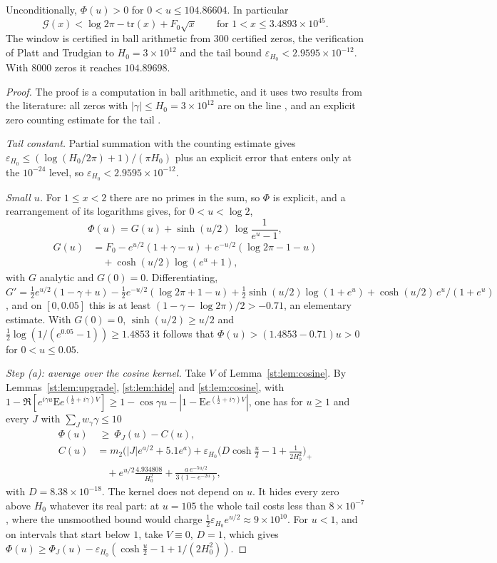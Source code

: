 \begin{theorem}\label{st:thm:cert}
Unconditionally, $\Phi(u)>0$ for $0<u\le104.86604$. In particular
\[
\mathcal G(x)<\log2\pi-\mathrm{tr}(x)+F_0\sqrt x\qquad\text{for }1<x\le3.4893\times10^{45}.
\]
The window is certified in ball arithmetic from 300 certified zeros, the verification of Platt and Trudgian to $H_0=3\times10^{12}$ and the tail bound $\varepsilon_{H_0}<2.9595\times10^{-12}$. With 8000 zeros it reaches $104.89698$.
\end{theorem}
\begin{proof}
The proof is a computation in ball arithmetic, and it uses two results from the literature: all zeros with $|\gamma|\le H_0=3\times10^{12}$ are on the line \cite{PT21}, and an explicit zero counting estimate for the tail \cite{HSW22}.

\emph{Tail constant.} Partial summation with the counting estimate gives $\varepsilon_{H_0}\le(\log(H_0/2\pi)+1)/(\pi H_0)$ plus an explicit error that enters only at the $10^{-24}$ level, so $\varepsilon_{H_0}<2.9595\times10^{-12}$.

\emph{Small $u$.} For $1\le x<2$ there are no primes in the sum, so $\Phi$ is explicit, and a rearrangement of its logarithms gives, for $0<u<\log2$,
\[
\Phi(u)=G(u)+\sinh(u/2)\,\log\frac1{e^u-1},
\]
\begin{align*}
G(u)&=F_0-e^{u/2}(1+\gamma-u)+e^{-u/2}(\log2\pi-1-u)\\
&\quad+\cosh(u/2)\log(e^u+1),
\end{align*}
with $G$ analytic and $G(0)=0$. Differentiating, $G'=\tfrac12e^{u/2}(1-\gamma+u)-\tfrac12e^{-u/2}(\log2\pi+1-u)+\tfrac12\sinh(u/2)\log(1+e^u)+\cosh(u/2)\,e^u/(1+e^u)$, and on $[0,0.05]$ this is at least $(1-\gamma-\log2\pi)/2>-0.71$, an elementary estimate. With $G(0)=0$, $\sinh(u/2)\ge u/2$ and $\tfrac12\log(1/(e^{0.05}-1))\ge1.4853$ it follows that $\Phi(u)>(1.4853-0.71)u>0$ for $0<u\le0.05$.

\emph{Step (a): average over the cosine kernel.} Take $V$ of Lemma~\ref{st:lem:cosine}. By Lemmas~\ref{st:lem:upgrade}, \ref{st:lem:hide} and \ref{st:lem:cosine}, with $1-\Re[e^{i\gamma u}\mathrm Ee^{(\frac12+i\gamma)V}]\ge1-\cos\gamma u-|1-\mathrm Ee^{(\frac12+i\gamma)V}|$, one has for $u\ge1$ and every $J$ with $\sum_Jw_\gamma\gamma\le10$
\begin{align*}
\Phi(u)&\ \ge\ \Phi_J(u)-C(u),\\
C(u)&=m_2\big(|J|e^{a/2}+5.1e^a\big)+\varepsilon_{H_0}\Big(D\cosh\frac u2-1+\frac1{2H_0^2}\Big)_+\\
&\quad+e^{u/2}\frac{4.934808}{H_0^2}+\frac{a\,e^{-5u/2}}{3(1-e^{-2u})},
\end{align*}
with $D=8.38\times10^{-18}$. The kernel does not depend on $u$. It hides every zero above $H_0$ whatever its real part: at $u=105$ the whole tail costs less than $8\times10^{-7}$, where the unsmoothed bound would charge $\tfrac12\varepsilon_{H_0}e^{u/2}\approx9\times10^{10}$. For $u<1$, and on intervals that start below $1$, take $V\equiv0$, $D=1$, which gives $\Phi(u)\ge\Phi_J(u)-\varepsilon_{H_0}(\cosh\tfrac u2-1+1/(2H_0^2))$.


\end{proof}
